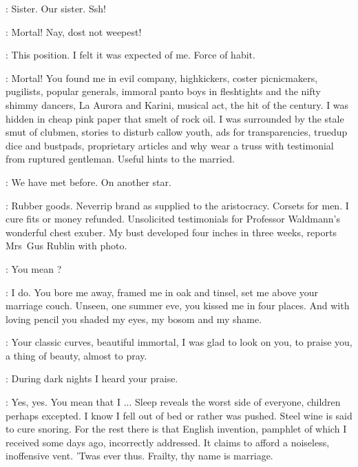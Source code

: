 \Yews:
Sister.
Our sister.
Ssh!

\Nymph:
Mortal!
Nay, dost not weepest!

\Bloom:
This position.
I felt it was expected of me.
Force of habit.

\Nymph:
Mortal!
You found me in evil company, highkickers,
coster picnicmakers, pugilists, popular generals,
immoral panto boys in fleshtights and the nifty shimmy dancers,
La Aurora and Karini, musical act, the hit of the century.
I was hidden in cheap pink paper that smelt of rock oil.
I was surrounded by the stale smut of clubmen,
stories to disturb callow youth, ads for transparencies,
truedup dice and bustpads, proprietary articles
and why wear a truss with testimonial from ruptured gentleman.
Useful hints to the married.

\Bloom:
We have met before.
On another star.

\Nymph:
Rubber goods.
Neverrip brand as supplied to the aristocracy.
Corsets for men.
I cure fits or money refunded.
Unsolicited testimonials for Professor Waldmann's wonderful chest exuber.
My bust developed four inches in three weeks, reports Mrs~Gus Rublin with photo.

\Bloom:
You mean ?

\Nymph:
I do.
You bore me away, framed me in oak and tinsel,
set me above your marriage couch.
Unseen, one summer eve, you kissed me in four places.
And with loving pencil you shaded my eyes, my bosom and my shame.

\Bloom:
Your classic curves, beautiful immortal,
I was glad to look on you, to praise you, a thing of beauty,
almost to pray.

\Nymph:
During dark nights I heard your praise.%

\Bloom:
Yes, yes.
You mean that I ...
Sleep reveals the worst side of everyone, children perhaps excepted.
I know I fell out of bed or rather was pushed.
Steel wine is said to cure snoring.
For the rest there is that English invention,
pamphlet of which I received some days ago, incorrectly addressed.
It claims to afford a noiseless, inoffensive vent.
'Twas ever thus.
Frailty, thy name is marriage.


